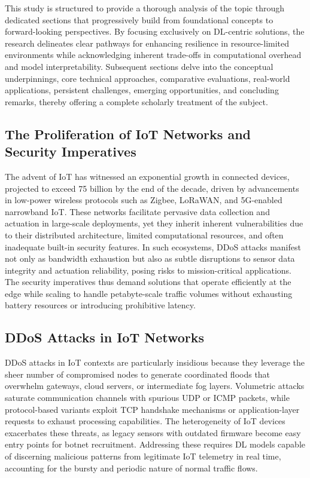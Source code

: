 \documentclass[12pt]{article}
\begin{document}
This study is structured to provide a thorough analysis of the topic through dedicated sections that progressively build from foundational concepts to forward-looking perspectives. By focusing exclusively on DL-centric solutions, the research delineates clear pathways for enhancing resilience in resource-limited environments while acknowledging inherent trade-offs in computational overhead and model interpretability. Subsequent sections delve into the conceptual underpinnings, core technical approaches, comparative evaluations, real-world applications, persistent challenges, emerging opportunities, and concluding remarks, thereby offering a complete scholarly treatment of the subject.

\subsection{The Proliferation of IoT Networks and Security Imperatives}

The advent of IoT has witnessed an exponential growth in connected devices, projected to exceed 75 billion by the end of the decade, driven by advancements in low-power wireless protocols such as Zigbee, LoRaWAN, and 5G-enabled narrowband IoT. These networks facilitate pervasive data collection and actuation in large-scale deployments, yet they inherit inherent vulnerabilities due to their distributed architecture, limited computational resources, and often inadequate built-in security features. In such ecosystems, DDoS attacks manifest not only as bandwidth exhaustion but also as subtle disruptions to sensor data integrity and actuation reliability, posing risks to mission-critical applications. The security imperatives thus demand solutions that operate efficiently at the edge while scaling to handle petabyte-scale traffic volumes without exhausting battery resources or introducing prohibitive latency.

\subsection{DDoS Attacks in IoT Networks}

DDoS attacks in IoT contexts are particularly insidious because they leverage the sheer number of compromised nodes to generate coordinated floods that overwhelm gateways, cloud servers, or intermediate fog layers. Volumetric attacks saturate communication channels with spurious UDP or ICMP packets, while protocol-based variants exploit TCP handshake mechanisms or application-layer requests to exhaust processing capabilities. The heterogeneity of IoT devices exacerbates these threats, as legacy sensors with outdated firmware become easy entry points for botnet recruitment. Addressing these requires DL models capable of discerning malicious patterns from legitimate IoT telemetry in real time, accounting for the bursty and periodic nature of normal traffic flows.
\end{document}
